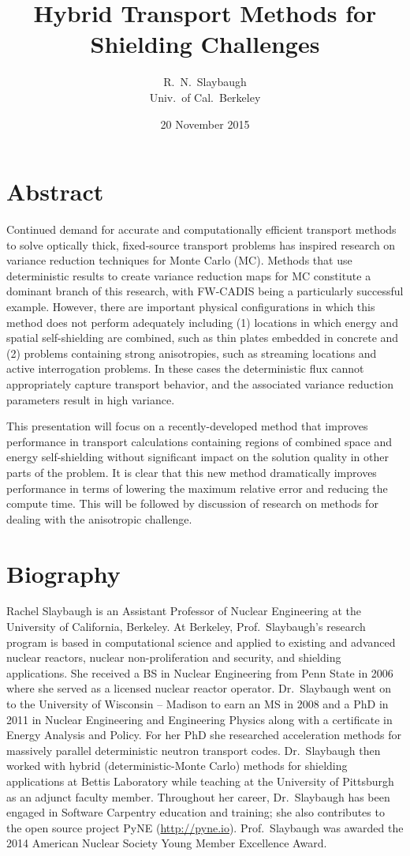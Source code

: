\documentclass[12pt]{article}
\title{Hybrid Transport Methods for Shielding Challenges}
\author{R.\ N.\ Slaybaugh \\ Univ.\ of Cal.\ Berkeley}
\date{20 November 2015}
\begin{document}
\maketitle

\section*{Abstract}

Continued demand for accurate and computationally efficient transport methods to solve optically thick, fixed-source transport problems has inspired research on variance reduction techniques for Monte Carlo (MC). Methods that use deterministic results to create variance reduction maps for MC constitute a dominant branch of this research, with FW-CADIS being a particularly successful example. However, there are important physical configurations in which this method does not perform adequately including (1) locations in which energy and spatial self-shielding are combined, such as thin plates embedded in concrete and (2) problems containing strong anisotropies, such as streaming locations and active interrogation problems. In these cases the deterministic flux cannot appropriately capture transport behavior, and the associated variance reduction parameters result in high variance. 

This presentation will focus on a recently-developed method that improves performance in transport calculations containing regions of combined space and energy self-shielding without significant impact on the solution quality in other parts of the problem. It is clear that this new method dramatically improves performance in terms of lowering the maximum relative error and reducing the compute time. This will be followed by discussion of research on methods for dealing with the anisotropic challenge.

\section*{Biography}
Rachel Slaybaugh is an Assistant Professor of Nuclear Engineering at the University of California, Berkeley. At Berkeley, Prof.\ Slaybaugh's research program is based in computational science and applied to existing and advanced nuclear reactors, nuclear non-proliferation and security, and shielding applications. She received a BS in Nuclear Engineering from Penn State in 2006 where she served as a licensed nuclear reactor operator. Dr.\ Slaybaugh went on to the University of Wisconsin -- Madison to earn an MS in 2008 and a PhD in 2011 in Nuclear Engineering and Engineering Physics along with a certificate in Energy Analysis and Policy. For her PhD she researched acceleration methods for massively parallel deterministic neutron transport codes. Dr.\ Slaybaugh then worked with hybrid (deterministic-Monte Carlo) methods for shielding applications at Bettis Laboratory while teaching at the University of Pittsburgh as an adjunct faculty member. Throughout her career, Dr.\ Slaybaugh has been engaged in Software Carpentry education and training; she also contributes to the open source project PyNE (\href{http://pyne.io}{http://pyne.io}). Prof.\ Slaybaugh was awarded the 2014 American Nuclear Society Young Member Excellence Award.
\end{document}
